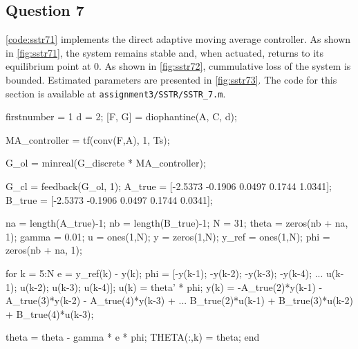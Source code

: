 \FloatBarrier
\subsection{Question 7}
 \autoref{code:sstr71} implements the direct adaptive moving average controller. As shown in \autoref{fig:sstr71}, the system remains stable and, when actuated, returns to its equilibrium point at $0$. As shown in \autoref{fig:sstr72}, cummulative loss of the system is bounded. Estimated parameters are presented in \autoref{fig:sstr73}. The code for this section is available at \lstinline|assignment3/SSTR/SSTR_7.m|. 

\begin{code}
	\begin{matlabcode}{firstnumber = 1}
d = 2;  %
[F, G] = diophantine(A, C, d);

MA_controller = tf(conv(F,A), 1, Ts);

G_ol = minreal(G_discrete * MA_controller);

G_cl = feedback(G_ol, 1);
A_true = [-2.5373   -0.1906    0.0497    0.1744    1.0341];
B_true = [-2.5373   -0.1906    0.0497    0.1744    0.0341];

na = length(A_true)-1; nb = length(B_true)-1;
N = 31;             
theta = zeros(nb + na, 1);  
gamma = 0.01;          
u = ones(1,N);
y = zeros(1,N);
y_ref = ones(1,N);
phi = zeros(nb + na, 1);

for k = 5:N
e = y_ref(k) - y(k);
phi = [-y(k-1); -y(k-2); -y(k-3); -y(k-4); ...
u(k-1); u(k-2); u(k-3); u(k-4)];
u(k) = theta' * phi;
y(k) = -A_true(2)*y(k-1) - A_true(3)*y(k-2) - A_true(4)*y(k-3) + ...
B_true(2)*u(k-1) + B_true(3)*u(k-2) + B_true(4)*u(k-3);

theta = theta - gamma * e * phi;
THETA(:,k) = theta;
end
	\end{matlabcode}
	\label{code:sstr71}
\end{code}

